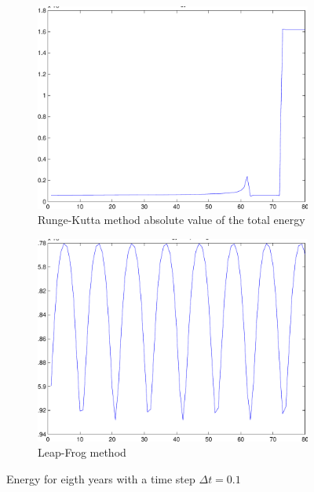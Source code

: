 \documentclass[a4paper,12pt, english]{article}
\begin{document}
\begin{figure}[H]
        \centering
        \begin{subfigure}[b]{0.6\textwidth}
                \includegraphics[width=\textwidth]{main_totE_rk4_dt_0_1.pdf}
                \caption{Runge-Kutta method absolute value of the total energy}
                \label{fig:RK4_dt_0.1}
        \end{subfigure}
       
        \begin{subfigure}[b]{0.8\textwidth}
                \includegraphics[width=\textwidth]{totE_main_lf_dt_0_1.pdf}
                \caption{Leap-Frog method}
                \label{fig:LF_dt_0.1}
        \end{subfigure}
        \caption{Energy for eigth years with a time step $\Delta t = 0.1$}
    
\end{figure}
\end{document}
